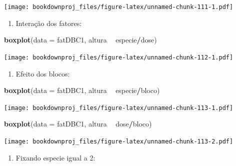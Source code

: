 \documentclass[
]{article}
\newenvironment{Shaded}{\begin{snugshade}}{\end{snugshade}}
\newcommand{\DataTypeTok}[1]{\textcolor[rgb]{0.13,0.29,0.53}{#1}}
\newcommand{\KeywordTok}[1]{\textcolor[rgb]{0.13,0.29,0.53}{\textbf{#1}}}
\newcommand{\NormalTok}[1]{#1}
\newcommand{\OperatorTok}[1]{\textcolor[rgb]{0.81,0.36,0.00}{\textbf{#1}}}
\newcommand{\StringTok}[1]{\textcolor[rgb]{0.31,0.60,0.02}{#1}}
\providecommand{\tightlist}{%
  \setlength{\itemsep}{0pt}\setlength{\parskip}{0pt}}
\begin{document}
\texttt{[image: bookdownproj\_files/figure-latex/unnamed-chunk-111-1.pdf]}

\begin{enumerate}
\def\labelenumi{\arabic{enumi}.}
\setcounter{enumi}{2}
\tightlist
\item
  Interação dos fatores:
\end{enumerate}

\begin{Shaded}
\begin{Highlighting}[]
\KeywordTok{boxplot}\NormalTok{(}\DataTypeTok{data =}\NormalTok{ fatDBC1, altura }\OperatorTok{~}\StringTok{ }\NormalTok{especie}\OperatorTok{/}\NormalTok{dose)}
\end{Highlighting}
\end{Shaded}

\texttt{[image: bookdownproj\_files/figure-latex/unnamed-chunk-112-1.pdf]}

\begin{enumerate}
\def\labelenumi{\arabic{enumi}.}
\setcounter{enumi}{3}
\tightlist
\item
  Efeito dos blocos:
\end{enumerate}

\begin{Shaded}
\begin{Highlighting}[]
\KeywordTok{boxplot}\NormalTok{(}\DataTypeTok{data =}\NormalTok{ fatDBC1, altura }\OperatorTok{~}\StringTok{ }\NormalTok{especie}\OperatorTok{/}\NormalTok{bloco)}
\end{Highlighting}
\end{Shaded}

\texttt{[image: bookdownproj\_files/figure-latex/unnamed-chunk-113-1.pdf]}

\begin{Shaded}
\begin{Highlighting}[]
\KeywordTok{boxplot}\NormalTok{(}\DataTypeTok{data =}\NormalTok{ fatDBC1, altura }\OperatorTok{~}\StringTok{ }\NormalTok{dose}\OperatorTok{/}\NormalTok{bloco)}
\end{Highlighting}
\end{Shaded}

\texttt{[image: bookdownproj\_files/figure-latex/unnamed-chunk-113-2.pdf]}

\begin{enumerate}
\def\labelenumi{\arabic{enumi}.}
\setcounter{enumi}{4}
\tightlist
\item
  Fixando especie igual a 2:
\end{enumerate}
\end{document}

